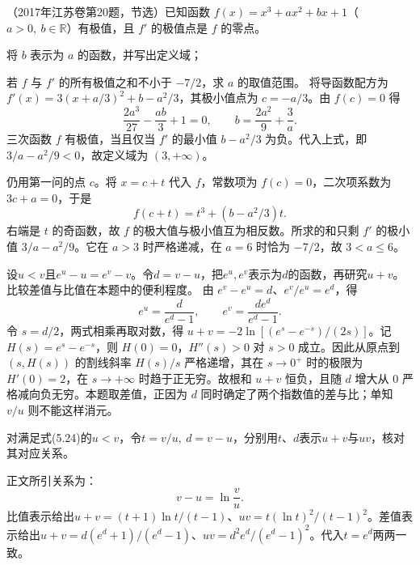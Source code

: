 （2017年江苏卷第20题，节选）已知函数 \(f(x)=x^3+ax^2+bx+1\)（\(a>0,\ b\in\mathbb R\)）有极值，且 \(f'\) 的极值点是 \(f\) 的零点。

将 \(b\) 表示为 \(a\) 的函数，并写出定义域；

若 \(f\) 与 \(f'\) 的所有极值之和不小于 \(-7/2\)，求 \(a\) 的取值范围。
\solutionanswer
{}将导函数配方为 \(f'(x)=3(x+a/3)^2+b-a^2/3\)，其极小值点为 \(c=-a/3\)。由 \(f(c)=0\) 得
\[
 \frac{2a^3}{27}-\frac{ab}{3}+1=0,\qquad b=\frac{2a^2}{9}+\frac3a .
\]
三次函数 \(f\) 有极值，当且仅当 \(f'\) 的最小值 \(b-a^2/3\) 为负。代入上式，即 \(3/a-a^2/9<0\)，故定义域为 \((3,+\infty)\)。

仍用第一问的点 \(c\)。将 \(x=c+t\) 代入 \(f\)，常数项为 \(f(c)=0\)，二次项系数为 \(3c+a=0\)，于是
\[
 f(c+t)=t^3+(b-a^2/3)t .
\]
右端是 \(t\) 的奇函数，故 \(f\) 的极大值与极小值互为相反数。所求的和只剩 \(f'\) 的极小值 \(3/a-a^2/9\)。它在 \(a>3\) 时严格递减，在 \(a=6\) 时恰为 \(-7/2\)，故 \(3<a\le6\)。


设\(u<v\)且\(e^u-u=e^v-v\)。令\(d=v-u\)，把\(e^u,e^v\)表示为\(d\)的函数，再研究\(u+v\)。比较差值与比值在本题中的便利程度。
\solutionanswer
由 \(e^v-e^u=d\)、\(e^v/e^u=e^d\)，得
\[
 e^u=\frac d{e^d-1},\qquad e^v=\frac{de^d}{e^d-1}.
\]
令 \(s=d/2\)，两式相乘再取对数，得 \(u+v=-2\ln[(e^s-e^{-s})/(2s)]\)。记 \(H(s)=e^s-e^{-s}\)，则 \(H(0)=0\)，\(H''(s)>0\) 对 \(s>0\) 成立。因此从原点到 \((s,H(s))\) 的割线斜率 \(H(s)/s\) 严格递增，其在 \(s\to0^+\) 时的极限为 \(H'(0)=2\)，在 \(s\to+\infty\) 时趋于正无穷。故根和 \(u+v\) 恒负，且随 \(d\) 增大从 \(0\) 严格减向负无穷。本题取差值，正因为 \(d\) 同时确定了两个指数值的差与比；单知 \(v/u\) 则不能这样消元。


对满足式\textup{(5.24)}的\(u<v\)，令\(t=v/u,\ d=v-u\)，分别用\(t\)、\(d\)表示\(u+v\)与\(uv\)，核对其对应关系。

\par\smallskip\noindent 正文所引关系为：
\begin{equation*}
v-u=\ln\frac vu.
\end{equation*}
\solutionanswer
比值表示给出\(u+v=(t+1)\ln t/(t-1)\)、\(uv=t(\ln t)^2/(t-1)^2\)。差值表示给出\(u+v=d(e^d+1)/(e^d-1)\)、\(uv=d^2e^d/(e^d-1)^2\)。代入\(t=e^d\)两两一致。


